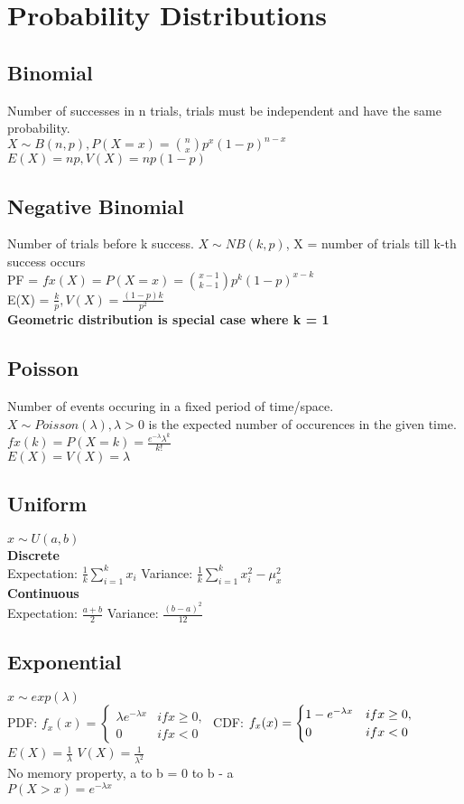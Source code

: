 \documentclass[10pt]{article}
\begin{document}
\section*{Probability Distributions}
\subsection*{Binomial}
Number of successes in n trials, trials must be independent and have the same probability.\\
$X \sim B(n,p), P(X=x) = {n \choose x} p^x(1-p)^{n-x} $\\ $E(X) = np, V(X) = np(1-p)$
\subsection*{Negative Binomial}
Number of trials before k success.
$X \sim NB(k,p)$, X = number of trials till k-th success occurs \\
PF = $ fx(X) = P(X = x) = {x - 1 \choose k - 1} p^k(1-p)^{x-k}$ \\
E(X) = $\frac{k}{p}, V(X) = \frac{(1-p)k}{p^2}$\\
\textbf{Geometric distribution is special case where k = 1}
\subsection*{Poisson}
Number of events occuring in a fixed period of time/space.\\
$X \sim Poisson(\lambda), \lambda > 0$ is the expected number of occurences in the given time.\\
$fx(k) = P(X = k) = \frac{e^{-\lambda}\lambda^k}{k!}$\\
$E(X) = V(X) = \lambda$
\subsection*{Uniform}
$x \sim U(a,b)$\\
\textbf{Discrete}\\
Expectation: $\frac{1}{k}\sum^k_{i=1}x_i$
Variance: $\frac{1}{k}\sum^k_{i=1}x_i^2 - \mu_x^2$\\
\textbf{Continuous}\\
Expectation: $\frac{a+b}{2}$
Variance: $\frac{(b-a)^2}{12}$
\subsection*{Exponential}
$x \sim exp(\lambda)$\\
PDF: $ f_x(x) =
    \begin{cases}
        \lambda e^{-\lambda x} & if x \geq 0, \\
        0                      & if x < 0
    \end{cases}
$ CDF: $ f_x(x) =
    \begin{cases}
        1 - e^{-\lambda x} & if x \geq 0, \\
        0                  & if x < 0
    \end{cases}\\
$ $E(X) = \frac{1}{\lambda}$  $V(X) = \frac{1}{\lambda^2}$ \\No memory property, a to b = 0 to b - a\\
$P(X > x) = e^{-\lambda x}$
\end{document}
